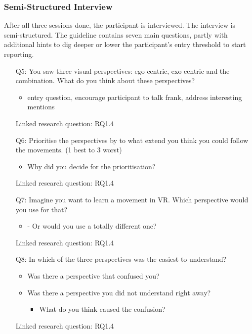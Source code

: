 \subsubsection{Semi-Structured Interview}
After all three sessions done, the participant is interviewed. The interview is semi-structured. The guideline contains seven main questions, partly with additional hints to dig deeper or lower the participant's entry threshold to start reporting.
\begin{itemize}
	\item[Q5:] You saw three visual perspectives: ego-centric, exo-centric and the combination. What do you think about these perspectives?
	\begin{itemize}
		\item entry question, encourage participant to talk frank, address interesting mentions
	\end{itemize}
	\item[] Linked research question: RQ1.4
	
	\item[Q6:] Prioritise the perspectives by to what extend you think you could follow the movements. (1 best to 3 worst) 	
	\begin{itemize}
		\item Why did you decide for the prioritisation?
	\end{itemize}
	\item[] Linked research question: RQ1.4
	
	\item[Q7:] Imagine you want to learn a movement in VR. Which perspective would you use for that?
	\begin{itemize}
		\item -	Or would you use a totally different one?
	\end{itemize}
	\item[] Linked research question: RQ1.4
	
	\item[Q8:] In which of the three perspectives was the easiest to understand? 
	\begin{itemize}
		\item Was there a perspective that confused you?
		\item Was there a perspective you did not understand right away?
		\begin{itemize}
			\item What do you think caused the confusion?
		\end{itemize}
	\end{itemize}
	\item[] Linked research question: RQ1.4
	

\end{itemize}
